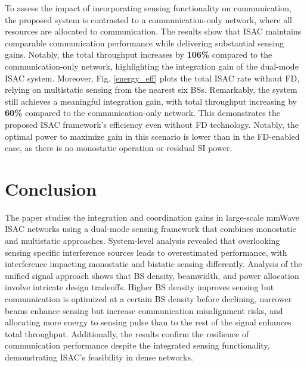 \documentclass[journal]{IEEEtran}
\begin{document}
To assess the impact of incorporating sensing functionality on communication, the proposed system is contrasted to a communication-only network, where all resources are allocated to communication. The results show that ISAC maintains comparable communication performance while delivering substantial sensing gains. Notably, the total throughput increases by \textbf{106\%} compared to the communication-only network, highlighting the integration gain of the dual-mode ISAC system.
Moreover, Fig. \ref{energy_eff} plots the total ISAC rate without FD, relying on multistatic sensing from the nearest six BSs. Remarkably, the system still achieves a meaningful integration gain, with total throughput increasing by \textbf{60\%} compared to the communication-only network. This demonstrates the proposed ISAC framework’s efficiency even without FD technology. Notably, the optimal power to maximize gain in this scenario is lower than in the FD-enabled case, as there is no monostatic operation or residual SI power.






 


\section{Conclusion}\label{con_pp}




The paper studies the integration and coordination gains in large-scale mmWave ISAC networks using a dual-mode sensing framework that combines monostatic and multistatic approaches. System-level analysis revealed that overlooking sensing specific interference sources leads to overestimated performance, with interference impacting monostatic and bistatic sensing differently.
Analysis of the unified signal approach shows that BS density, beamwidth, and power allocation involve intricate design tradeoffs. Higher BS density improves sensing but communication is optimized at a certain BS density before declining, narrower beams enhance sensing but increase communication misalignment risks, and allocating more energy to sensing pulse than to the rest of the signal enhances total throughput. Additionally, the results confirm the resilience of communication performance despite the integrated sensing functionality, demonstrating ISAC's feasibility in dense networks.
\end{document}
